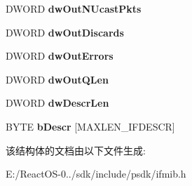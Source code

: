\begin{DoxyCompactItemize}
D\+W\+O\+RD {\bfseries dw\+Out\+N\+Ucast\+Pkts}
\item 
\mbox{\label{struct___m_i_b___i_f_r_o_w_aeef328c206f89969716c52f3bd387a89}} 
D\+W\+O\+RD {\bfseries dw\+Out\+Discards}
\item 
\mbox{\label{struct___m_i_b___i_f_r_o_w_a1ea4c81af5f9ffd0644955822a781c01}} 
D\+W\+O\+RD {\bfseries dw\+Out\+Errors}
\item 
\mbox{\label{struct___m_i_b___i_f_r_o_w_a0c414b184cea46105ecfb1b3151ea0b6}} 
D\+W\+O\+RD {\bfseries dw\+Out\+Q\+Len}
\item 
\mbox{\label{struct___m_i_b___i_f_r_o_w_a94762db52e8472e0f3aa0adb2f795774}} 
D\+W\+O\+RD {\bfseries dw\+Descr\+Len}
\item 
\mbox{\label{struct___m_i_b___i_f_r_o_w_a717ce4f2a861c2d7bd32191598d5282a}} 
B\+Y\+TE {\bfseries b\+Descr} \mbox{[}M\+A\+X\+L\+E\+N\+\_\+\+I\+F\+D\+E\+S\+CR\mbox{]}
\end{DoxyCompactItemize}


该结构体的文档由以下文件生成\+:\begin{DoxyCompactItemize}
\item 
E\+:/\+React\+O\+S-\/0../sdk/include/psdk/ifmib.\+h\end{DoxyCompactItemize}
